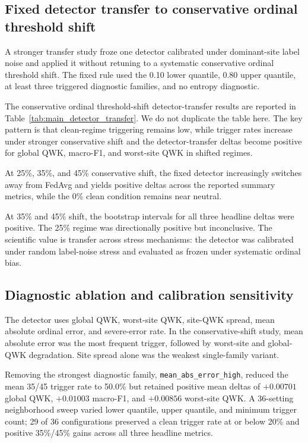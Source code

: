 \subsection{Fixed detector transfer to conservative ordinal threshold shift}
A stronger transfer study froze one detector calibrated under dominant-site label noise and applied it without retuning to a systematic conservative ordinal threshold shift. The fixed rule used the 0.10 lower quantile, 0.80 upper quantile, at least three triggered diagnostic families, and no entropy diagnostic.

The conservative ordinal threshold-shift detector-transfer results are reported in Table~\ref{tab:main_detector_transfer}. We do not duplicate the table here. The key pattern is that clean-regime triggering remains low, while trigger rates increase under stronger conservative shift and the detector-transfer deltas become positive for global QWK, macro-F1, and worst-site QWK in shifted regimes.

At 25\%, 35\%, and 45\% conservative shift, the fixed detector increasingly switches away from FedAvg and yields positive deltas across the reported summary metrics, while the 0\% clean condition remains near neutral.

At 35\% and 45\% shift, the bootstrap intervals for all three headline deltas were positive. The 25\% regime was directionally positive but inconclusive. The scientific value is transfer across stress mechanisms: the detector was calibrated under random label-noise stress and evaluated as frozen under systematic ordinal bias.

\subsection{Diagnostic ablation and calibration sensitivity}
The detector uses global QWK, worst-site QWK, site-QWK spread, mean absolute ordinal error, and severe-error rate. In the conservative-shift study, mean absolute error was the most frequent trigger, followed by worst-site and global-QWK degradation. Site spread alone was the weakest single-family variant.

Removing the strongest diagnostic family, \texttt{mean\_abs\_error\_high}, reduced the mean 35/45 trigger rate to 50.0\% but retained positive mean deltas of $+0.00701$ global QWK, $+0.01003$ macro-F1, and $+0.00856$ worst-site QWK. A 36-setting neighborhood sweep varied lower quantile, upper quantile, and minimum trigger count; 29 of 36 configurations preserved a clean trigger rate at or below 20\% and positive 35\%/45\% gains across all three headline metrics.

